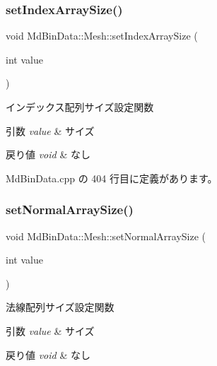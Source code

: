 \subsubsection{\texorpdfstring{set\+Index\+Array\+Size()}{setIndexArraySize()}}
{\footnotesize\ttfamily void Md\+Bin\+Data\+::\+Mesh\+::set\+Index\+Array\+Size (\begin{DoxyParamCaption}\item[{int}]{value }\end{DoxyParamCaption})}



インデックス配列サイズ設定関数 


\begin{DoxyParams}{引数}
{\em value} & サイズ \\
\hline
\end{DoxyParams}

\begin{DoxyRetVals}{戻り値}
{\em void} & なし \\
\hline
\end{DoxyRetVals}


 Md\+Bin\+Data.\+cpp の 404 行目に定義があります。

\mbox{\label{class_md_bin_data_1_1_mesh_a3fa1284fb7ee273be83925b118fbf918}} 
\subsubsection{\texorpdfstring{set\+Normal\+Array\+Size()}{setNormalArraySize()}}
{\footnotesize\ttfamily void Md\+Bin\+Data\+::\+Mesh\+::set\+Normal\+Array\+Size (\begin{DoxyParamCaption}\item[{int}]{value }\end{DoxyParamCaption})}



法線配列サイズ設定関数 


\begin{DoxyParams}{引数}
{\em value} & サイズ \\
\hline
\end{DoxyParams}

\begin{DoxyRetVals}{戻り値}
{\em void} & なし \\
\hline
\end{DoxyRetVals}


